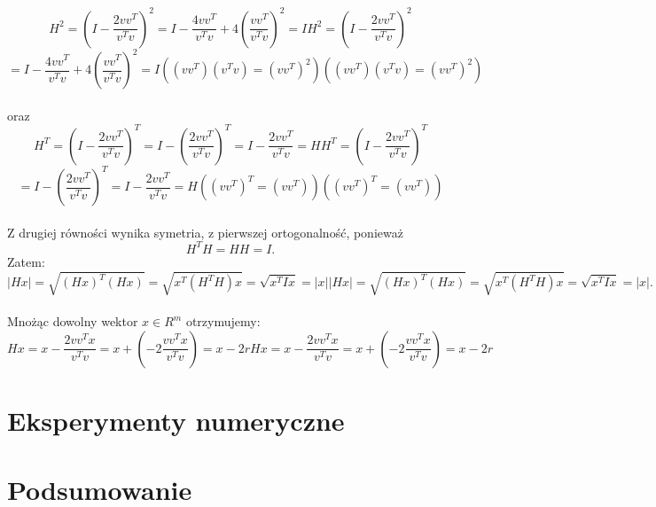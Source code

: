 \documentclass[10pt,a4paper]{report}
\begin{document}
$${\displaystyle H^{2}=\left(I-{\frac {2vv^{T}}{v^{T}v}}\right)^{2}=I-{\frac {4vv^{T}}{v^{T}v}}+4\left({\frac {vv^{T}}{v^{T}v}}\right)^{2}=I} {\displaystyle H^{2}=\left(I-{\frac {2vv^{T}}{v^{T}v}}\right)^{2}}$$ \newline  $$= {I-{\frac {4vv^{T}}{v^{T}v}}+4\left({\frac {vv^{T}}{v^{T}v}}\right)^{2}=I}       {\displaystyle ((vv^{T})(v^{T}v)=(vv^{T})^{2})} {\displaystyle ((vv^{T})(v^{T}v)=(vv^{T})^{2})}$$\\
oraz\\

$${\displaystyle H^{T}=\left(I-{\frac {2vv^{T}}{v^{T}v}}\right)^{T}=I-\left({\frac {2vv^{T}}{v^{T}v}}\right)^{T}=I-{\frac {2vv^{T}}{v^{T}v}}=H} {\displaystyle H^{T}=\left(I-{\frac {2vv^{T}}{v^{T}v}}\right)^{T}}$$ \newline $$={I-\left({\frac {2vv^{T}}{v^{T}v}}\right)^{T}=I-{\frac {2vv^{T}}{v^{T}v}}=H}       {\displaystyle ((vv^{T})^{T}=(vv^{T}))} {\displaystyle ((vv^{T})^{T}=(vv^{T}))}$$\\
Z drugiej równości wynika symetria, z pierwszej ortogonalność, ponieważ $${\displaystyle H^{T}H=HH=I}. $$ Zatem:\\

$${\displaystyle |Hx|={\sqrt {(Hx)^{T}(Hx)}}={\sqrt {x^{T}(H^{T}H)x}}={\sqrt {x^{T}Ix}}=|x|} {\displaystyle |Hx|={\sqrt {(Hx)^{T}(Hx)}}={\sqrt {x^{T}(H^{T}H)x}}={\sqrt {x^{T}Ix}}=|x|}. $$\\
Mnożąc dowolny wektor ${\displaystyle x\in R^{m}}$ otrzymujemy:\\

$${\displaystyle Hx=x-{\frac {2vv^{T}x}{v^{T}v}}=x+(-2{\frac {vv^{T}x}{v^{T}v}})=x-2r} {\displaystyle Hx=x-{\frac {2vv^{T}x}{v^{T}v}}=x+(-2{\frac {vv^{T}x}{v^{T}v}})=x-2r}$$





\chapter{Eksperymenty numeryczne}

\chapter{Podsumowanie}




\end{document}
